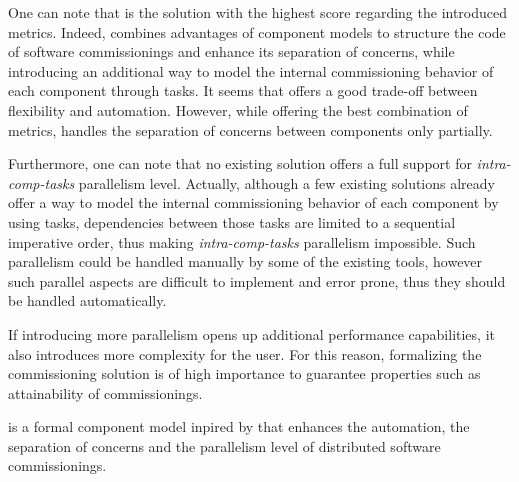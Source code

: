 One can note that \aeolus is the solution with the highest score
regarding the introduced metrics. Indeed, \aeolus combines advantages
of component models to structure the code of software commissionings
and enhance its separation of concerns, while introducing an
additional way to model the internal commissioning behavior of each
component through tasks. It seems that \aeolus offers a good trade-off
between flexibility and automation. However, while offering the best
combination of metrics, \aeolus handles the separation of
concerns between components only partially.

Furthermore, one can note that no existing solution offers a full
support for \emph{intra-comp-tasks} parallelism level. Actually, although a few
existing solutions already offer a way to model the internal
commissioning behavior of each component by using tasks, dependencies
between those tasks are limited to a sequential imperative order, thus
making \emph{intra-comp-tasks} parallelism impossible. Such parallelism
could be handled manually by some of the existing tools, however such
parallel aspects are difficult to implement and error prone, thus they
should be handled automatically.

If introducing more parallelism opens up additional performance
capabilities, it also introduces more complexity for the user. For
this reason, formalizing the commissioning solution is of high
importance to guarantee properties such as attainability of
commissionings.

\begin{tcolorbox}[enhanced,attach boxed title to top left={yshift=-3mm,yshifttext=-1mm},
  colback=black!5!white,colframe=black!30,colbacktitle=black!60,
  title=Contribution,fonttitle=\bfseries,
  boxed title style={size=small,colframe=black!60,boxrule=0.2mm},
  boxrule=0.2mm]
  \mad is a formal component model inpired by \aeolus that enhances
  the automation, the separation of concerns and the parallelism level
  of distributed software commissionings.
\end{tcolorbox}


